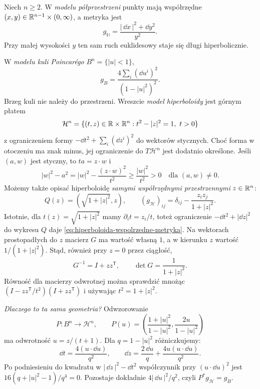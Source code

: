 \begin{przyklad}
\label{prz:trzy-modele-hiperboliczne}
Niech $n\geq2$. W \emph{modelu półprzestrzeni}
punkty mają współrzędne $(x,y)\in\mathbb{R}^{n-1}\times(0,\infty)$,
a metryka jest
\begin{equation}\label{eq:hip-polprzestrzen}
 g_{\mathbb H}=\frac{|\,\dd x\,|^2+\dd y^2}{y^2}.
\end{equation}
Przy małej wysokości $y$ ten sam ruch euklidesowy
staje się długi hiperbolicznie.

W \emph{modelu kuli Poincarégo} $B^n=\{|u|<1\}$,
\begin{equation}\label{eq:hip-kula}
 g_B=\frac{4\sum_i(\dd u^i)^2}{(1-|u|^2)^2}.
\end{equation}
Brzeg kuli nie należy do przestrzeni. Wreszcie
\emph{model hiperboloidy} jest górnym płatem
\[
 \mathcal H^n=\{(t,z)\in\mathbb{R}\times\mathbb{R}^n:
                    t^2-|z|^2=1,\ t>0\}
\]
z ograniczeniem formy $-\dd t^2+\sum_i(\dd z^i)^2$
do wektorów stycznych. Choć forma w otoczeniu
ma znak minus, jej ograniczenie do $T\mathcal H^n$
jest dodatnio określone. Jeśli $(a,w)$ jest styczny,
to $ta=z\cdot w$ i
\[
 |w|^2-a^2
 =|w|^2-\frac{(z\cdot w)^2}{t^2}
 \geq\frac{|w|^2}{t^2}>0
 \quad\text{dla }(a,w)\ne0.
\]
Możemy także opisać hiperboloidę \emph{samymi
współrzędnymi przestrzennymi} $z\in\mathbb{R}^n$:
\begin{equation}\label{eq:hiperboloida-wspolrzedne-metryka}
 Q(z)=(\sqrt{1+|z|^2},z),\qquad
 (g_{\mathcal H})_{ij}
   =\delta_{ij}-\frac{z_i z_j}{1+|z|^2}.
\end{equation}
Istotnie, dla $t(z)=\sqrt{1+|z|^2}$ mamy
$\partial_i t=z_i/t$, toteż ograniczenie
$-\dd t^2+|\dd z|^2$ do wykresu $Q$ daje
\eqref{eq:hiperboloida-wspolrzedne-metryka}.
Na wektorach prostopadłych do $z$ macierz $G$
ma wartość własną $1$, a w kierunku $z$
wartość $1/(1+|z|^2)$. Stąd, również przy $z=0$
przez ciągłość,
\begin{equation}\label{eq:hiperboloida-macierz-odwrotna}
 G^{-1}=I+zz^{\mathsf T},\qquad
 \det G=\frac1{1+|z|^2}.
\end{equation}
Równość dla macierzy odwrotnej można sprawdzić
mnożąc $(I-zz^{\mathsf T}/t^2)(I+zz^{\mathsf T})$
i używając $t^2=1+|z|^2$.

\emph{Dlaczego to ta sama geometria?}
Odwzorowanie
\[
 P:B^n\longrightarrow\mathcal H^n,\qquad
 P(u)=\left(\frac{1+|u|^2}{1-|u|^2},
            \frac{2u}{1-|u|^2}\right)
\]
ma odwrotność $u=z/(t+1)$.
Dla $q=1-|u|^2$ różniczkujemy:
\[
 \dd t=\frac{4(u\cdot\dd u)}{q^2},
 \qquad
 \dd z=\frac{2\,\dd u}{q}
          +\frac{4u(u\cdot\dd u)}{q^2}.
\]
Po podniesieniu do kwadratu w
$|\,\dd z\,|^2-\dd t^2$ współczynnik przy
$(u\cdot\dd u)^2$ jest
$16(q+|u|^2-1)/q^4=0$. Pozostaje dokładnie
$4|\,\dd u\,|^2/q^2$, czyli $P^*g_{\mathcal H}=g_B$.


\end{przyklad}
